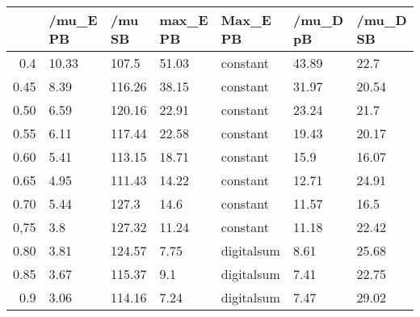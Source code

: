\begin{table}[ht]
\centering
\begin{tabular}{rllllll}
  \hline
 & /mu\_E PB & /mu SB & max\_E PB & Max\_E PB & /mu\_D pB & /mu\_D SB \\ 
  \hline
0.4 & 10.33 & 107.5 & 51.03 & constant & 43.89 & 22.7 \\ 
  0.45 & 8.39 & 116.26 & 38.15 & constant & 31.97 & 20.54 \\ 
  0.50 & 6.59 & 120.16 & 22.91 & constant & 23.24 & 21.7 \\ 
  0.55 & 6.11 & 117.44 & 22.58 & constant & 19.43 & 20.17 \\ 
  0.60 & 5.41 & 113.15 & 18.71 & constant & 15.9 & 16.07 \\ 
  0.65 & 4.95 & 111.43 & 14.22 & constant & 12.71 & 24.91 \\ 
  0.70 & 5.44 & 127.3 & 14.6 & constant & 11.57 & 16.5 \\ 
  0,75 & 3.8 & 127.32 & 11.24 & constant & 11.18 & 22.42 \\ 
  0.80 & 3.81 & 124.57 & 7.75 & digitalsum & 8.61 & 25.68 \\ 
  0.85 & 3.67 & 115.37 & 9.1 & digitalsum & 7.41 & 22.75 \\ 
  0.9 & 3.06 & 114.16 & 7.24 & digitalsum & 7.47 & 29.02 \\ 
   \hline
\end{tabular}
\end{table}
